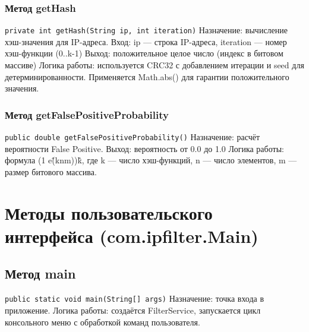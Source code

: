 \subsubsection{Метод getHash}
\texttt{private int getHash(String ip, int iteration)}
Назначение: вычисление хэш-значения для IP-адреса.
Вход: ip — строка IP-адреса, iteration — номер хэш-функции (0..k-1)
Выход: положительное целое число (индекс в битовом массиве)
Логика работы: используется CRC32 с добавлением итерации и seed для детерминированности. Применяется Math.abs() для гарантии положительного значения.
\subsubsection{Метод getFalsePositiveProbability}
\texttt{public double getFalsePositiveProbability()}
Назначение: расчёт вероятности False Positive.
Выход: вероятность от 0.0 до 1.0
Логика работы: формула (1 \- e\^(\-kn\/m))\^k, где k — число хэш-функций, n — число элементов, m — размер битового массива.

\section{Методы пользовательского интерфейса (com.ipfilter.Main)}
\subsection{Метод main}
\texttt{public static void main(String[] args)}
Назначение: точка входа в приложение.
Логика работы: создаётся FilterService, запускается цикл консольного меню с обработкой команд пользователя.



	


